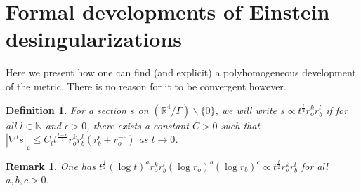 \documentclass[12pt]{article}
\newtheorem{defn}[thm]{Definition}
\newtheorem{rem}[thm]{Remark}
\begin{document}
   
  \section{Formal developments of Einstein desingularizations}\label{formal dvp}
  
  
      Here we present how one can find (and explicit) a polyhomogeneous development of the metric. There is no reason for it to be convergent however. 
\begin{defn}
    For a section $s$ on $(\mathbb{R}^4\slash\Gamma)\backslash\{0\}$, we will write $s\propto t^\frac{l}{2}r_o^kr_b^l$ if for all $l\in\mathbb{N}$ and $\epsilon>0$, there exists a constant $C>0$ such that $|\nabla^ls|_\mathbf{e}\leqslant C_lt^\frac{l-\epsilon}{2} r_o^kr_b^l(r_b^\epsilon+r_o^{-\epsilon})$ as $t\to 0$.
\end{defn}
\begin{rem}
    One has $t^\frac{l}{2}(\log t)^a r_o^kr_b^l(\log r_o)^b (\log r_b)^c\propto t^\frac{l}{2}r_o^kr_b^l$ for all $a,b,c >0$.
\end{rem}
\end{document}
